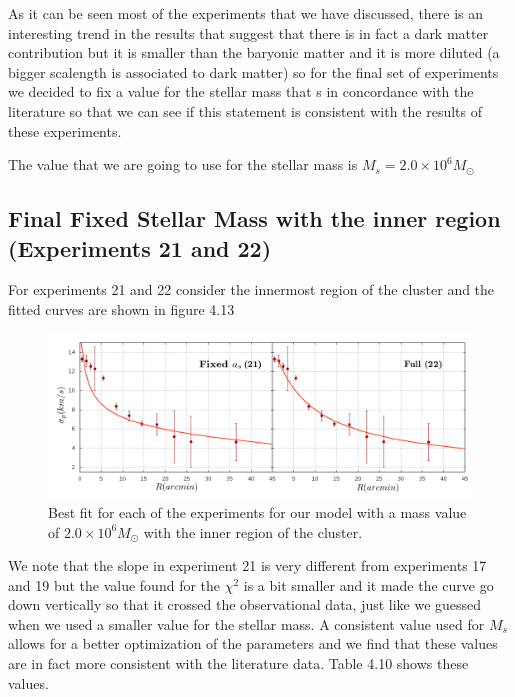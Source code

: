 As it can be seen most of the experiments that we have discussed, there is an interesting trend in the results that suggest that there is in fact a dark matter contribution but it is smaller than the baryonic matter and it is more diluted (a bigger scalength is associated to dark matter) so for the final set of experiments we decided to fix a value for the stellar mass that s in concordance with the literature so that we can see if this statement is consistent with the results of these experiments. 

The value that we are going to use for the stellar mass is $M_{s}=2.0 \times 10^{6} M_{\odot}$

\subsection{Final Fixed Stellar Mass with the inner region (Experiments 21 and 22)}

For experiments 21 and 22 consider the innermost region of the cluster and the fitted curves are shown in figure 4.13

\begin{figure}[H]
\centering
\includegraphics[width=15cm]{images/Starlight_25_12_1.png}
\caption[Best fits for our model with a mass value based on the Starlight procedures with the inner region.]{Best fit for each of the experiments for our model with a mass value of $2.0 \times 10^{6} M_{\odot}$ with the inner region of the cluster.}
\end{figure}

We note that the slope in experiment 21 is very different from experiments 17 and 19 but the value found for the $\chi^{2}$ is a bit smaller and it made the curve go down vertically so that it crossed the observational data, just like we guessed when we used a smaller value for the stellar mass. A consistent value used for $M_s$ allows for a better optimization of the parameters and we find that these values are in fact more consistent with the literature data. Table 4.10 shows these values.

